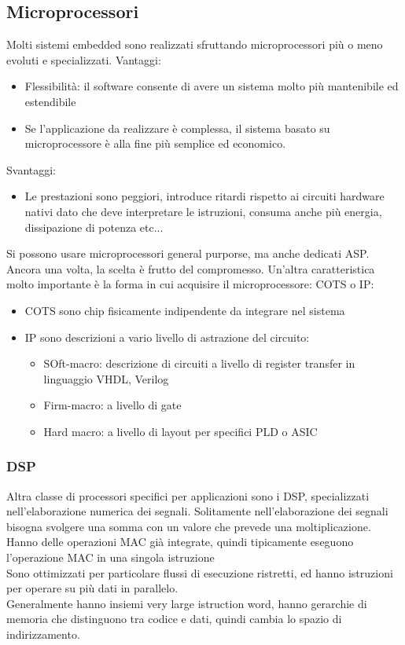 \documentclass[12pt, oneside]{extbook}
\begin{document}
\subsection{Microprocessori}
Molti sistemi embedded sono realizzati sfruttando microprocessori più o meno evoluti e specializzati. Vantaggi:
\begin{itemize}
\item Flessibilità: il software consente di avere un sistema molto più mantenibile ed estendibile
\item Se l'applicazione da realizzare è complessa, il sistema basato su microprocessore è alla fine più semplice ed economico.
\end{itemize}
Svantaggi:
\begin{itemize}
\item Le prestazioni sono peggiori, introduce ritardi rispetto ai circuiti hardware nativi dato che deve interpretare le istruzioni, consuma anche più energia, dissipazione di potenza etc...
\end{itemize}
Si possono usare microprocessori general purporse, ma anche dedicati ASP. Ancora una volta, la scelta è frutto del compromesso. Un'altra caratteristica molto importante è la forma in cui acquisire il microprocessore: COTS o IP:
\begin{itemize}
\item COTS sono chip fisicamente indipendente da integrare nel sistema
\item IP sono descrizioni a vario livello di astrazione del circuito:
\begin{itemize}
\item SOft-macro: descrizione di circuiti a livello di register transfer in linguaggio VHDL, Verilog
\item Firm-macro: a livello di gate 
\item Hard macro: a livello di layout per specifici PLD o ASIC
\end{itemize}
\end{itemize}
\subsubsection{DSP}
Altra classe di processori specifici per applicazioni sono i DSP, specializzati nell'elaborazione numerica dei segnali. Solitamente nell'elaborazione dei segnali bisogna svolgere una somma con un valore che prevede una moltiplicazione. Hanno delle operazioni MAC già integrate, quindi tipicamente eseguono l'operazione MAC in una singola istruzione\\ Sono ottimizzati per particolare flussi di esecuzione ristretti, ed hanno istruzioni per operare su più dati in parallelo.\\ Generalmente hanno insiemi very large istruction word, hanno gerarchie di memoria che distinguono tra codice e dati, quindi cambia lo spazio di indirizzamento.
\end{document}
